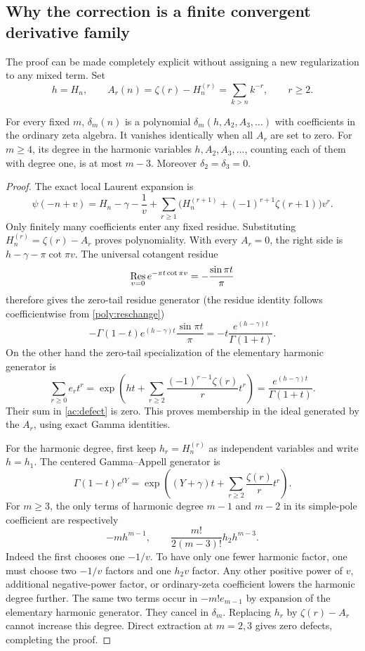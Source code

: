 \subsection{Why the correction is a finite convergent derivative family}

The proof can be made completely explicit without assigning a new
regularization to any mixed term. Set
\begin{equation}\label{ac:tails}
 h=H_n,\qquad A_r(n)=\zeta(r)-H_n^{(r)}=\sum_{k>n}k^{-r},
                     \qquad r\ge2.
\end{equation}

\begin{lemma}
\label{ac:tailideal}
For every fixed $m$, $\delta_m(n)$ is a polynomial
$\delta_m(h,A_2,A_3,\ldots)$ with coefficients in the ordinary
zeta algebra. It vanishes identically when all $A_r$ are set to
zero. For $m\ge4$, its degree in the harmonic variables
$h,A_2,A_3,\ldots$, counting each of them with degree one, is at
most $m-3$. Moreover $\delta_2=\delta_3=0$.
\end{lemma}

\begin{proof}
The exact local Laurent expansion is
\begin{equation}\label{ac:local}
 \psi(-n+v)=H_n-\gamma-\frac1v
       +\sum_{r\ge1}\bigl(H_n^{(r+1)}+(-1)^{r+1}\zeta(r+1)\bigr)v^r.
\end{equation}
Only finitely many coefficients enter any fixed residue. Substituting
$H_n^{(r)}=\zeta(r)-A_r$ proves polynomiality.
With every $A_r=0$, the right side is
$h-\gamma-\pi\cot\pi v$. The universal cotangent residue
\[
 \operatorname*{Res}_{v=0}e^{-\pi t\cot\pi v}=-\frac{\sin\pi t}{\pi}
\]
therefore gives the zero-tail residue generator (the residue identity follows coefficientwise from \eqref{poly:reschange})
\[
 -\Gamma(1-t)e^{(h-\gamma)t}\frac{\sin\pi t}{\pi}
 =-t\frac{e^{(h-\gamma)t}}{\Gamma(1+t)}.
\]
On the other hand the zero-tail specialization of the elementary
harmonic generator is
\[
 \sum_{r\ge0}e_r t^r
 =\exp\left(ht+\sum_{r\ge2}\frac{(-1)^{r-1}\zeta(r)}r t^r\right)
 =\frac{e^{(h-\gamma)t}}{\Gamma(1+t)}.
\]
Their sum in \eqref{ac:defect} is zero. This proves membership in
the ideal generated by the $A_r$, using exact Gamma identities.

For the harmonic degree, first keep $h_r=H_n^{(r)}$ as independent
variables and write $h=h_1$. The centered Gamma--Appell generator is
\[
 \Gamma(1-t)e^{tY}
 =\exp\left((Y+\gamma)t+\sum_{r\ge2}\frac{\zeta(r)}r t^r\right).
\]
For $m\ge3$, the only terms of harmonic degree $m-1$ and $m-2$
in its simple-pole coefficient are respectively
\[
 -m h^{m-1},\qquad
 \frac{m!}{2(m-3)!}h_2h^{m-3}.
\]
Indeed the first chooses one $-1/v$. To have only one fewer
harmonic factor, one must choose two $-1/v$ factors and one
$h_2v$ factor. Any other positive power of $v$, additional
negative-power factor, or ordinary-zeta coefficient lowers the
harmonic degree further. The same two terms occur in
$-m!e_{m-1}$ by expansion of the elementary harmonic generator.
They cancel in $\delta_m$. Replacing $h_r$ by $\zeta(r)-A_r$
cannot increase this degree. Direct extraction at $m=2,3$ gives
zero defects, completing the proof.
\end{proof}

